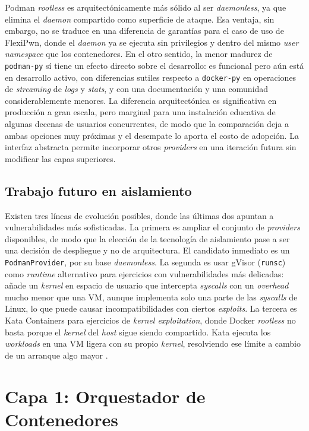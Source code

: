 Podman \textit{rootless} es arquitectónicamente más sólido al ser
\textit{daemonless}, ya que elimina el \textit{daemon} compartido como
superficie de ataque. Esa ventaja, sin embargo, no se traduce en una diferencia
de garantías para el caso de uso de FlexiPwn, donde el \textit{daemon} ya se
ejecuta sin privilegios y dentro del mismo \textit{user namespace} que los
contenedores. En el otro sentido, la menor madurez de \texttt{podman-py} sí
tiene un efecto directo sobre el desarrollo: es funcional pero aún está en
desarrollo activo, con diferencias sutiles respecto a \texttt{docker-py} en
operaciones de \textit{streaming} de \textit{logs} y \textit{stats}, y con una
documentación y una comunidad considerablemente menores. La diferencia
arquitectónica es significativa en producción a gran escala, pero marginal para
una instalación educativa de algunas decenas de usuarios concurrentes, de modo
que la comparación deja a ambas opciones muy próximas y el desempate lo aporta
el costo de adopción. La interfaz abstracta permite incorporar otros
\textit{providers} en una iteración futura sin modificar las capas superiores.

\subsection{Trabajo futuro en aislamiento}

Existen tres líneas de evolución posibles, donde las últimas dos apuntan a
vulnerabilidades más sofisticadas. La primera es ampliar el conjunto de
\textit{providers} disponibles, de modo que la elección de la tecnología de
aislamiento pase a ser una decisión de despliegue y no de arquitectura. El
candidato inmediato es un \texttt{PodmanProvider}, por su base
\textit{daemonless}. La segunda es usar gVisor (\texttt{runsc}) como
\textit{runtime} alternativo para ejercicios con vulnerabilidades más delicadas:
añade un \textit{kernel} en espacio de usuario que intercepta \textit{syscalls}
con un \textit{overhead} mucho menor que una VM, aunque implementa solo una
parte de las \textit{syscalls} de Linux, lo que puede causar incompatibilidades
con
ciertos \textit{exploits}. La tercera es Kata Containers para ejercicios de
\textit{kernel exploitation}, donde Docker \textit{rootless} no basta porque el
\textit{kernel} del \textit{host} sigue siendo compartido. Kata ejecuta los
\textit{workloads} en una VM ligera con su propio \textit{kernel}, resolviendo
ese límite
a cambio de un arranque algo mayor \cite{northflank-isolation}.

\section{Capa 1: Orquestador de Contenedores}

